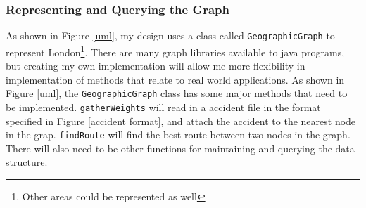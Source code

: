 \documentclass[11pt,twoside,a4paper]{article}
\begin{document}
\subsubsection{Representing and Querying the Graph}
As shown in Figure \ref{uml}, my design uses a class called \texttt{GeographicGraph} to represent London\footnote{Other areas could be represented as well}. There are many graph libraries available to java programs, but creating my own implementation
 will allow me more flexibility in implementation of methods that relate to real world applications. As shown in Figure \ref{uml}, the \texttt{GeographicGraph} class has some major methods that need to be implemented. \texttt{gatherWeights} will 
 read in a accident file in the format specified in Figure \ref{accident format}, and attach the accident to the nearest node in the grap. \texttt{findRoute} will find the best route between two nodes in the graph.
There will also need to be other functions for maintaining and querying the data structure.
\end{document}
